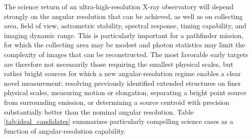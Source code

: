 \documentclass{article}
\begin{document}
The science return of an ultra-high-resolution X-ray observatory will depend strongly on the angular resolution that can be achieved, as well as on collecting area, field of view, astrometric stability, spectral response, timing capability, and imaging dynamic range.  This is particularly important for a pathfinder mission, for which the collecting area may be modest and photon statistics may limit the complexity of images that can be reconstructed. The most favorable early targets are therefore not necessarily those requiring the smallest physical scales, but rather bright sources for which a new angular-resolution regime enables a clear novel measurement: resolving previously identified extended structures on finer physical scales, measuring motion or elongation, separating a bright point source from surrounding emission, or determining a source centroid with precision substantially better than the nominal angular resolution. Table \ref{tab:ideal_candidates} summarizes particularly compelling science cases as a function of angular-resolution capability.
\end{document}

